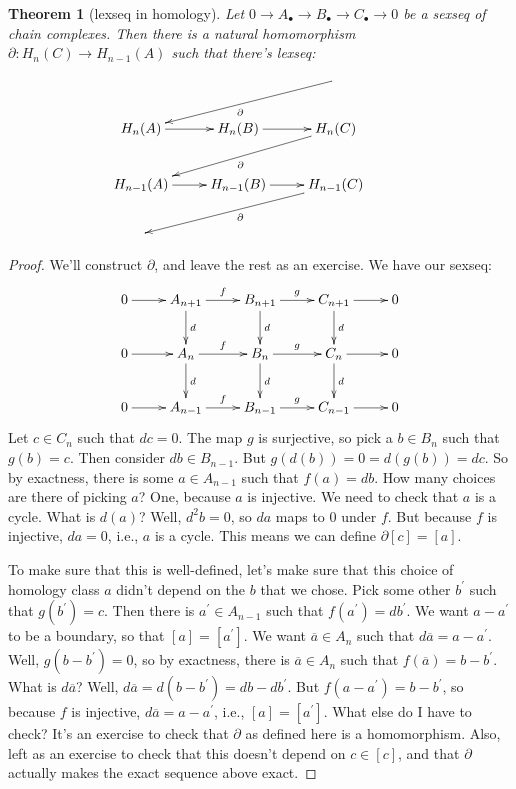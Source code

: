 \documentclass{amsart}
\theoremstyle{theorem}
\newtheorem{theorem}{Theorem}[section]
\theoremstyle{definition}
\begin{document}
\begin{theorem}[lexseq in homology]
Let $0\to A_\bullet\to B_\bullet\to C_\bullet\to 0$ be a sexseq of chain complexes. Then there is a natural homomorphism $\partial: H_n(C)\to H_{n-1}(A)$ such that there's lexseq:
\begin{equation*}
\xymatrix{ & & \ar[dll]^\partial\\
 H_n(A)\ar[r] & H_n(B)\ar[r] & H_n(C)\ar[dll]^\partial\\
 H_{n-1}(A)\ar[r] & H_{n-1}(B)\ar[r] & H_{n-1}(C)\ar[dll]^\partial\\
 & & &}
\end{equation*}
\end{theorem}
\begin{proof}
We'll construct $\partial$, and leave the rest as an exercise. We have our sexseq:
\begin{equation*}
\xymatrix{0\ar[r] & A_{n+1}\ar[r]^f\ar[d]^d & B_{n+1}\ar[r]^g\ar[d]^d & C_{n+1}\ar[r]\ar[d]^d & 0\\
0\ar[r] & A_n\ar[r]^f\ar[d]^d & B_n\ar[r]^g\ar[d]^d & C_n\ar[r]\ar[d]^d & 0\\
0\ar[r] & A_{n-1}\ar[r]^f & B_{n-1}\ar[r]^g & C_{n-1}\ar[r] & 0}
\end{equation*}
Let $c\in C_n$ such that $dc=0$. The map $g$ is surjective, so pick a $b\in B_n$ such that $g(b)=c$. Then consider $db\in B_{n-1}$. But $g(d(b))=0=d(g(b))=dc$. So by exactness, there is some $a\in A_{n-1}$ such that $f(a)=db$. How many choices are there of picking $a$? One, because $a$ is injective. We need to check that $a$ is a cycle. What is $d(a)$? Well, $d^2b=0$, so $da$ maps to $0$ under $f$. But because $f$ is injective, $da=0$, i.e., $a$ is a cycle. This means we can define $\partial[c]=[a]$.

To make sure that this is well-defined, let's make sure that this choice of homology class $a$ didn't depend on the $b$ that we chose. Pick some other $b^\prime$ such that $g(b^\prime)=c$. Then there is $a^\prime\in A_{n-1}$ such that $f(a^\prime)=db^\prime$. We want $a-a^\prime$ to be a boundary, so that $[a]=[a^\prime]$. We want $\overline{a}\in A_n$ such that $d\overline{a}=a-a^\prime$. Well, $g(b-b^\prime)=0$, so by exactness, there is $\overline{a}\in A_n$ such that $f(\overline{a})=b-b^\prime$. What is $d\overline{a}$? Well, $d\overline{a}=d(b-b^\prime)=db-db^\prime$. But $f(a-a^\prime)=b-b^\prime$, so because $f$ is injective, $d\overline{a}=a-a^\prime$, i.e., $[a]=[a^\prime]$. What else do I have to check? It's an exercise to check that $\partial$ as defined here is a homomorphism. Also, left as an exercise to check that this doesn't depend on $c\in[c]$, and that $\partial$ actually makes the exact sequence above exact.
\end{proof}
\end{document}
